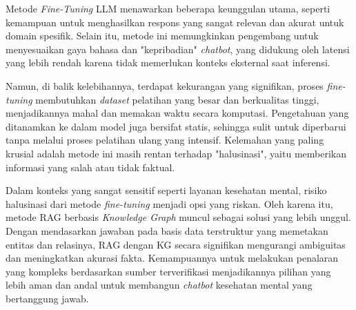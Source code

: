\pagebreak
Metode \textit{Fine-Tuning} LLM menawarkan beberapa keunggulan utama, seperti kemampuan untuk menghasilkan respons yang sangat relevan dan akurat untuk domain spesifik.
Selain itu, metode ini memungkinkan pengembang untuk menyesuaikan gaya bahasa dan "kepribadian" \textit{chatbot}, yang didukung oleh latensi yang lebih rendah karena tidak memerlukan konteks eksternal saat inferensi.

Namun, di balik kelebihannya, terdapat kekurangan yang signifikan, proses \textit{fine-tuning} membutuhkan \textit{dataset} pelatihan yang besar dan berkualitas tinggi, menjadikannya mahal dan memakan waktu secara komputasi.
Pengetahuan yang ditanamkan ke dalam model juga bersifat statis, sehingga sulit untuk diperbarui tanpa melalui proses pelatihan ulang yang intensif.
Kelemahan yang paling krusial adalah metode ini masih rentan terhadap "halusinasi", yaitu memberikan informasi yang salah atau tidak faktual.

Dalam konteks yang sangat sensitif seperti layanan kesehatan mental, risiko halusinasi dari metode \textit{fine-tuning} menjadi opsi yang riskan.
Oleh karena itu, metode RAG berbasis \textit{\textit{Knowledge Graph}} muncul sebagai solusi yang lebih unggul.
Dengan mendasarkan jawaban pada basis data terstruktur yang memetakan entitas dan relasinya, RAG dengan KG secara signifikan mengurangi ambiguitas dan meningkatkan akurasi fakta.
Kemampuannya untuk melakukan penalaran yang kompleks berdasarkan sumber terverifikasi menjadikannya pilihan yang lebih aman dan andal untuk membangun \textit{chatbot} kesehatan mental yang bertanggung jawab.
